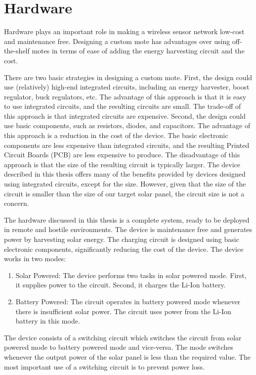\chapter{Hardware}
Hardware plays an important role in making a wireless sensor network low-cost and maintenance free. Designing a custom mote has advantages over using off-the-shelf motes in terms of ease of adding the energy harvesting circuit and the cost.

There are two basic strategies in designing a custom mote. First, the design could use (relatively) high-end integrated circuits, including an energy harvester, boost regulator, buck regulators, etc. The advantage of this approach is that it is easy to use integrated circuits, and the resulting circuits are small. The trade-off of this approach is that integrated circuits are expensive. Second, the design could use basic components, such as resistors, diodes, and capacitors. The advantage of this approach is a reduction in the cost of the device. The basic electronic components are less expensive than integrated circuits, and the resulting Printed Circuit Boards (PCB) are less expensive to produce. The disadvantage of this approach is that the size of the resulting circuit is typically larger. The device described in this thesis offers many of the benefits provided by devices designed using integrated circuits, except for the size. However, given that the size of the circuit is smaller than the size of our target solar panel, the circuit size is not a concern.

The hardware discussed in this thesis is a complete system, ready to be deployed in remote and hostile environments. The device is maintenance free and generates power by harvesting solar energy. The charging circuit is designed using basic electronic components, significantly reducing the cost of the device. The device works in two modes:
\begin{enumerate}
\item Solar Powered:
The device performs two tasks in solar powered mode. First, it supplies power to the circuit. Second, it charges the Li-Ion battery.
\item Battery Powered:
The circuit operates in battery powered mode whenever there is insufficient solar power. The circuit uses power from the Li-Ion battery in this mode.
\end{enumerate}

The device consists of a switching circuit which switches the circuit from solar powered mode to battery powered mode and vice-versa. The mode switches whenever the output power of the solar panel is less than the required value. The most important use of a switching circuit is to prevent power loss.


